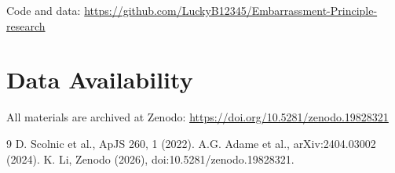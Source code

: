 \documentclass[10pt,twocolumn]{article}
\begin{document}
Code and data:  
\url{https://github.com/LuckyB12345/Embarrassment-Principle-research}

\section{Data Availability}
All materials are archived at Zenodo:  
\url{https://doi.org/10.5281/zenodo.19828321}

\begin{thebibliography}{9}
 D. Scolnic et al., ApJS 260, 1 (2022).
 A.G. Adame et al., arXiv:2404.03002 (2024).
 K. Li, Zenodo (2026), doi:10.5281/zenodo.19828321.
\end{thebibliography}
\end{document}
